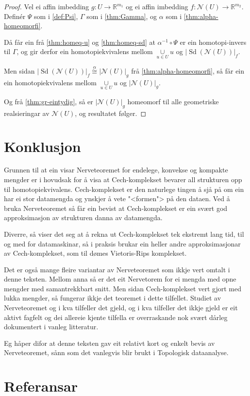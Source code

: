 \documentclass[a4paper, 12pt, norsk]{article}
\theoremstyle{plain}
\theoremstyle{definition}
\newcommand{\Rb}{\mathbb{R}}
\newcommand{\Nc}{\mathcal{N}}
\newcommand{\union}{ \mathop{\cup}\limits }
\newcommand{\gr}[1]{ \lvert #1 \rvert } %
\DeclareMathOperator{\Sd}{Sd} %
\begin{document}
\begin{proof}
	Vel ei affin imbedding \( g: U \to \Rb^{m_1} \) og ei affin imbedding \( f: \Nc(U) \to \Rb^{m_2} \). Definér \( \Psi \) som i \autoref{def:Psi}, \( \Gamma \) som i \autoref{thm:Gamma}, og \( \alpha \) som i \autoref{thm:alpha-homeomorfi}.

	Då får ein frå \autoref{thm:homeq-u} og \autoref{thm:homeq-sd} at \( \alpha^{-1} \circ \Psi \) er ein homotopi-invers til \( \Gamma \), og gir derfor ein homotopiekvivalens mellom \( \union_{u \in U} u \) og \( \gr{\Sd(\Nc(U))}_f \).

	Men sidan \( \gr{\Sd(\Nc(U))}_f \stackrel{\alpha}{\cong} \gr{\Nc(U)}_g \) frå \autoref{thm:alpha-homeomorfi}, så får ein ein homotopiekvivalens mellom \( \union_{u \in U} u \) og \( \gr{\Nc(U)}_g \).

	Og frå \autoref{thm:gr-eintydig}, så er \( \gr{\Nc(U)}_g \) homeomorf til alle geometriske realsieringar av \( \Nc(U) \), og resultatet følger.
\end{proof}

\section{Konklusjon}

Grunnen til at ein visar Nerveteoremet for endelege, konvekse og kompakte mengder er i hovudsak for å visa at Cech-komplekset bevarer all strukturen opp til homotopiekvivalens. Cech-komplekset er den naturlege tingen å sjå på om ein har ei stor datamengda og ynskjer å vete "<formen"> på den dataen. Ved å bruka Nerveteoremet så får ein bevist at Cech-komplekset er ein svært god approksimasjon av strukturen danna av datamengda.

Diverre, så viser det seg at å rekna ut Cech-komplekset tek ekstremt lang tid, til og med for datamaskinar, så i praksis brukar ein heller andre approksimasjonar av Cech-komplekset, som til dømes Vietoris-Rips komplekset.

Det er også mange fleire variantar av Nerveteoremet som ikkje vert omtalt i denne teksten. Mellom anna så er det eit Nervetorem for ei mengda med opne mengder med samantrekkbart snitt. Men sidan Cech-komplekset vert gjort med lukka mengder, så fungerar ikkje det teoremet i dette tilfellet. Studiet av Nerveteoremet og i kva tilfeller det gjeld, og i kva tilfeller det ikkje gjeld er eit aktivt fagfelt og dei allereie kjente tilfella er overraskande nok svært dårleg dokumentert i vanleg litteratur.

Eg håper difor at denne teksten gav eit relativt kort og enkelt bevis av Nerveteoremet, sånn som det vanlegvis blir brukt i Topologisk dataanalyse.

\section{Referansar}

{}

\end{document}
